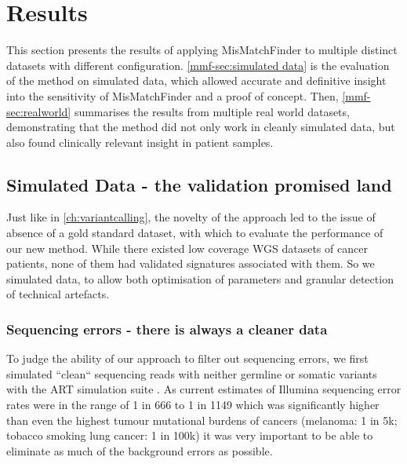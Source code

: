 
\section{Results}
\label{mmf-sec:results}
This section presents the results of applying MisMatchFinder to multiple distinct datasets with different configuration. \autoref{mmf-sec:simulated data} is the evaluation of the method on simulated data, which allowed accurate and definitive insight into the sensitivity of MisMatchFinder and a proof of concept. Then, \autoref{mmf-sec:realworld} summarises the results from multiple real world datasets, demonstrating that the method did not only work in cleanly simulated data, but also found clinically relevant insight in patient samples.

\subsection{Simulated Data - the validation promised land}
\label{mmf-sec:simulated data}
Just like in \autoref{ch:variantcalling}, the novelty of the approach led to the issue of absence of a gold standard dataset, with which to evaluate the performance of our new method. While there existed low coverage WGS datasets of cancer patients, none of them had validated signatures associated with them. So we simulated data, to allow both optimisation of parameters and granular detection of technical artefacts. 

\subsubsection{Sequencing errors - there is always a cleaner data}
\label{mmf-sec:cleanSim}
To judge the ability of our approach to filter out sequencing errors, we first simulated ``clean`` sequencing reads with neither germline or somatic variants with the ART simulation suite \cite{Huang2011}. As current estimates of Illumina sequencing error rates were in the range of 1 in 666 to 1 in 1149 \cite{Stoler2021} which was significantly higher than even the highest tumour mutational burdens of  cancers (melanoma: 1 in 5k; tobacco smoking lung cancer: 1 in 100k) it was very important to be able to eliminate as much of the background errors as possible.

